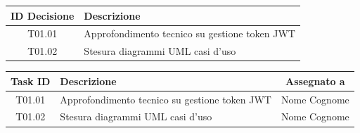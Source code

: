 \documentclass[a4paper, 11pt]{article}
\begin{document}
\begin{tabularx}{\textwidth}{|c|X|}
    \hline
    \textbf{ID Decisione} & \textbf{Descrizione} \\ \hline
    T01.01 & Approfondimento tecnico su gestione token JWT \\ \hline
    T01.02 & Stesura diagrammi UML casi d'uso \\ \hline
\end{tabularx}

\vspace{2cm}

\noindent
\begin{tabularx}{\textwidth}{|c|X|c|}
    \hline
    \textbf{Task ID} & \textbf{Descrizione} & \textbf{Assegnato a} \\ \hline
    T01.01 & Approfondimento tecnico su gestione token JWT & Nome Cognome \\ \hline
    T01.02 & Stesura diagrammi UML casi d'uso & Nome Cognome \\ \hline
\end{tabularx}
\end{document}
